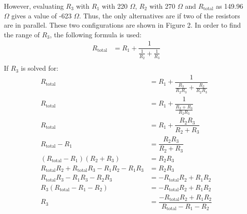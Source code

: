 \documentclass [12pt, letterpaper, twoside] {article}
\begin{document}
However, evaluating \(R_{3}\) with \(R_{1}\) with 220 \(\Omega\), \(R_{2}\) with 270 \(\Omega\) and \(R_{\text{total}}\) as 149.96 \(\Omega\) gives a value of -623 \(\Omega\). Thus, the only alternatives are if two of the resistors are in parallel. These two configurations are shown in Figure 2. In order to find the range of \(R_{3}\), the following formula is used:
\begin{equation*}
  \begin{split}
    R_{\text{total}} &= R_{1} + \dfrac{1}{\tfrac{1}{R_{2}} + \tfrac{1}{R_{3}}} \\
  \end{split}
\end{equation*}
If \(R_{3}\) is solved for:
\begin{equation*}
  \begin{split}
    R_{\text{total}} &= R_{1} + \dfrac{1}{\tfrac{R_{3}}{R_{2}R_{3}} + \tfrac{R_{2}}{R_{2}R_{3}}} \\
    R_{\text{total}} &= R_{1} + \dfrac{1}{\tfrac{R_{2} + R_{3}}{R_{2}R_{3}}} \\
    R_{\text{total}} &= R_{1} + \dfrac{R_{2}R_{3}}{R_{2} + R_{3}} \\
    R_{\text{total}} - R_{1} &= \dfrac{R_{2}R_{3}}{R_{2} + R_{3}} \\
    (R_{\text{total}} - R_{1})(R_{2} + R_{3} ) &= R_{2}R_{3} \\
    R_{\text{total}}R_{2} + R_{\text{total}}R_{3} - R_{1}R_{2} - R_{1}R_{3} &= R_{2}R_{3} \\
    R_{\text{total}}R_{3} -R_{1}R_{3} - R_{2}R_{3} &= -R_{\text{total}}R_{2} + R_{1}R_{2} \\
    R_{3}(R_{\text{total}} - R_{1} - R_{2}) &=  -R_{\text{total}}R_{2} + R_{1}R_{2} \\
    R_{3} &= \dfrac{-R_{\text{total}}R_{2} + R_{1}R_{2}}{R_{\text{total}} - R_{1} - R_{2}} \\
  \end{split}
\end{equation*}
\end{document}
